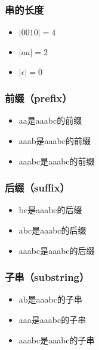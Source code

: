 \subsubsection{串的长度}

\begin{itemize}
	\item $ |0010| = 4 $
	\item $ |aa| = 2 $
	\item $ |\epsilon| = 0 $
\end{itemize}

\vspace{0.5cm}

\subsubsection{前缀（prefix）}

\begin{itemize}
	\item aa是aaabc的前缀
	\item aaab是aaabc的前缀
	\item aaabc是aaabc的前缀
\end{itemize}

\vspace{0.5cm}

\subsubsection{后缀（suffix）}

\begin{itemize}
	\item bc是aaabc的后缀
	\item abc是aaabc的后缀
	\item aaabc是aaabc的后缀
\end{itemize}

\vspace{0.5cm}

\subsubsection{子串（substring）}

\begin{itemize}
	\item ab是aaabc的子串
	\item aaa是aaabc的子串
	\item aaabc是aaabc的子串
\end{itemize}

\vspace{0.5cm}

